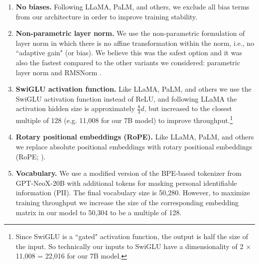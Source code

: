 \documentclass[11pt]{article}
\begin{document}
\begin{enumerate}[itemsep=1mm,leftmargin=4.5mm]
    \item \textbf{No biases.} Following LLaMA, PaLM, and others, we exclude all bias terms from our architecture in order to improve training stability.

    \item \textbf{Non-parametric layer norm.} We use the non-parametric formulation of layer norm \citep{Ba2016LayerNorm} in which there is no affine transformation within the norm, i.e., no ``adaptive gain" (or bias). We believe this was the safest option and it was also the fastest compared to the other variants we considered: parametric layer norm and RMSNorm \citep{RMSNorm}.

    \item \textbf{SwiGLU activation function.} Like LLaMA, PaLM, and others we use the SwiGLU activation function \citep{Shazeer2020GLUVI} instead of ReLU, and following LLaMA the activation hidden size is approximately $\frac{8}{3}d$, but increased to the closest multiple of 128 (e.g. 11,008 for our 7B model) to improve throughput.\footnote{Since SwiGLU is a ``gated" activation function, the output is half the size of the input. So technically our inputs to SwiGLU have a dimensionality of 2 $\times$ 11,008 = 22,016 for our 7B model.}

    \item \textbf{Rotary positional embeddings (RoPE).} Like LLaMA, PaLM, and others we replace absolute positional embeddings with rotary positional embeddings (RoPE; \citealp{Su2021RoFormerET}).

    \item \textbf{Vocabulary.} We use a modified version of the BPE-based tokenizer from GPT-NeoX-20B \citep{gpt-neox-20b} with additional tokens for masking personal identifiable information (PII). The final vocabulary size is 50,280.
    However, to maximize training throughput we increase the size of the corresponding embedding matrix in our model to 50,304 
    to be
    a multiple of 128.
\end{enumerate}
\end{document}
